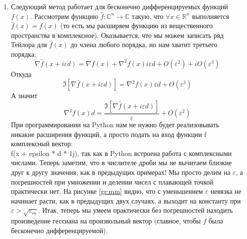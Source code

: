 \documentclass[a4paper, 12pt]{article}
\begin{document}
\begin{enumerate}
    \item Следующий метод работает для бесконечно дифференцируемых функций $f(x)$. Рассмотрим функцию $\hat{f}: \mathbb{C}^n \to \mathbb{C}$ такую, что $\forall x \in \mathbb{R}^n$ выполняется $\hat{f}(x) = f(x)$ (то есть мы расширяем функцию из вещественного пространства в комплексное). Оказывается, что мы можем записать ряд Тейлора для $\hat{f}(x)$ до члена любого порядка, но нам хватит третьего порядка:
    $$\nabla \hat{f}(x + i\varepsilon d) = \nabla f(x) + \nabla^2 f(x) i\varepsilon d + O(\varepsilon^2) + iO(\varepsilon^3)$$
    Откуда $$\Im{\left[\nabla \hat{f}(x + i\varepsilon d)\right]} = \nabla^2 f(x) \varepsilon d + O(\varepsilon^3)$$
    А значит
    $$\nabla^2 f(x) d = \frac{\Im{\left[\nabla \hat{f}(x + i\varepsilon d)\right]}}{\varepsilon} + O(\varepsilon^2)$$
    При программировании на Python нам не нужно будет реализовывать никакие расширения функций, а просто подать на вход функции \textsf{f\(\)} комплексный вектор:\\ \textsf{f(x + epsilon * d * 1j)}, так как в Python встроена работа с комплексными числами. Теперь заметим, что в числителе дроби мы не вычитаем близкие друг к другу значения, как в предыдущих примерах! Мы просто делим на $\varepsilon$, а погрешностей при умножении и делении чисел с плавающей точкой практически нет. На рисунке \ref{gr:mm} видно, что с уменьшением $\varepsilon$ невязка не начинает расти, как в предыдущих двух случаях, а выходит на константу при $\varepsilon > \sqrt{\varepsilon_m}$. Итак, теперь мы умеем практически без погрешностей находить произведение гессиана на произвольный вектор (главное, чтобы $f$ была бесконечно дифференцируемой).
\end{enumerate}
\end{document}
